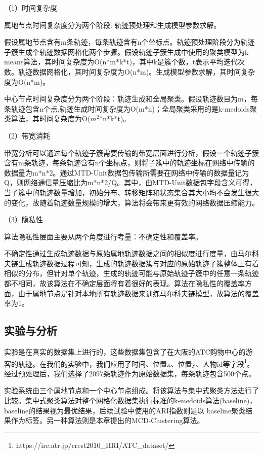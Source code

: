 （1）时间复杂度

属地节点时间复杂度分为两个阶段: 轨迹预处理和生成模型参数求解。

假设属地节点含有m条轨迹，每条轨迹含有n个坐标点。轨迹预处理阶段分为轨迹子簇生成个轨迹数据网格化两个步骤。假设轨迹子簇生成中使用的聚类模型为k-means算法，其时间复杂度为O(n*m*k*t)，其中k是簇个数，t表示平均迭代次数。轨迹数据网格化，其时间复杂度为O(n*m)。生成模型参数求解，其时间复杂度为O(n*m)。

中心节点时间复杂度分为两个阶段：轨迹生成和全局聚类。假设轨迹数目为m，每条轨迹包含n个点,轨迹生成时间复杂度为O(m*n)；全局聚类采用的是k-medoids聚类算法，其时间复杂度为O($m^2$*n*k*t)。

（2）带宽消耗

带宽分析可以通过每个轨迹子簇需要传输的带宽层面进行分析，假设一个轨迹子簇含有m条轨迹，每条轨迹含有n个坐标点，则将子簇中的轨迹坐标在网络中传输的数据量为m*n*2。通过MTD-Unit数据包传输所需要在网络中传输的数据量记为Q，则网络通信量压缩比为m*n*2/Q。其中，由MTD-Unit数据包字段含义可得，当子簇中的轨迹数量增加，初始分布、转移矩阵和状态集合其大小均不会发生很大的变化，故随着轨迹数量规模的增大，算法将会带来更有效的网络数据压缩能力。

（3）隐私性

算法隐私性层面主要从两个角度进行考量：不确定性和覆盖率。

不确定性通过生成轨迹数据与原始属地轨迹数据之间的相似度进行度量，由马尔科夫链生成轨迹数据过程可知，生成的轨迹数据簇与对应的原始轨迹子簇整体上有着相似的分布，但针对单个轨迹，生成的轨迹可能与原始轨迹子簇中的任意一条轨迹都不相同，故该算法在不确定层面将有着很好的表现。算法在隐私性的覆盖率方面，由于属地节点是针对本地所有轨迹数据来训练马尔科夫链模型，故算法的覆盖率为1。

\subsection{实验与分析}

实验是在真实的数据集上进行的，这些数据集包含了在大阪的ATC购物中心的游客的轨迹。在我们的实验中，我们应用了时间、位置x、位置y、人物id等字段\footnote[1]{https://irc.atr.jp/crest2010_HRI/ATC_dataset/}。经过预处理后，我们选择了2097条轨迹作为原始数据集，每条轨迹包含500个点。

实验系统由三个属地节点和一个中心节点组成。将该算法与集中式聚类方法进行了比较。集中式聚类算法对整个网格化数据集执行标准的k-medoids算法(baseline)， baseline的结果视为最优结果，后续试验中使用的ARI指数则是以 baseline聚类结果作为标签。另一种算法则是本章提出的MCD-Clustering算法。

